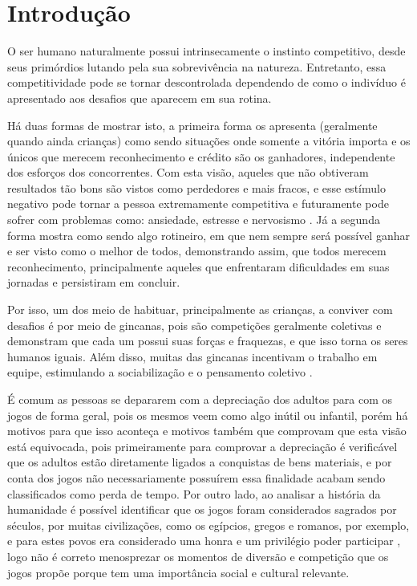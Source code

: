 
\chapter[Introdução]{Introdução}

O ser humano naturalmente possui intrinsecamente o instinto competitivo, desde seus primórdios lutando pela sua sobrevivência na natureza. Entretanto, essa competitividade pode se tornar descontrolada dependendo de como o indivíduo é apresentado aos desafios que aparecem em sua rotina.

Há duas formas de mostrar isto, a primeira forma os apresenta (geralmente quando ainda crianças) como sendo situações onde somente a vitória importa e os únicos que merecem reconhecimento e crédito são os ganhadores, independente dos esforços dos concorrentes. Com esta visão, aqueles que não obtiveram resultados tão bons são vistos como perdedores e mais fracos, e esse estímulo negativo pode tornar a pessoa extremamente competitiva e futuramente pode sofrer com problemas como: ansiedade, estresse e nervosismo  . Já a segunda forma mostra como sendo algo rotineiro, em que nem sempre será possível ganhar e ser visto como o melhor de todos, demonstrando assim, que todos merecem reconhecimento, principalmente aqueles que enfrentaram dificuldades em suas jornadas e persistiram em concluir.

Por isso, um dos meio de habituar, principalmente as crianças, a conviver com desafios é por meio de gincanas, pois são competições geralmente coletivas e demonstram que cada um possui suas forças e fraquezas, e que isso torna os seres humanos iguais. Além disso, muitas das gincanas incentivam o trabalho em equipe, estimulando a sociabilização e o pensamento coletivo .

É comum as pessoas se depararem com a depreciação dos adultos para com os jogos de forma geral, pois os mesmos veem como algo inútil ou infantil, porém há motivos para que isso aconteça e motivos também que comprovam que esta visão está equivocada, pois primeiramente para comprovar a depreciação é verificável que os adultos estão diretamente ligados a conquistas de bens materiais, e por conta dos jogos não necessariamente possuírem essa finalidade acabam sendo classificados como perda de tempo. Por outro lado, ao analisar a história da humanidade é possível identificar que os jogos foram considerados sagrados por séculos, por muitas civilizações, como os egípcios, gregos e romanos, por exemplo, e para estes povos era considerado uma honra e um privilégio poder participar , logo não é correto menosprezar os momentos de diversão e competição que os jogos propõe porque tem uma importância social e cultural relevante.


